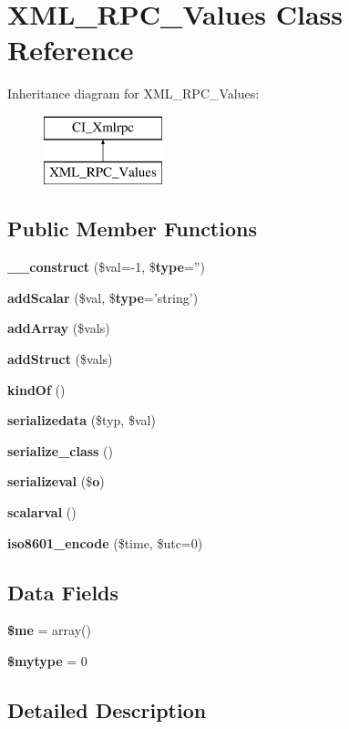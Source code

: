 \section{X\-M\-L\-\_\-\-R\-P\-C\-\_\-\-Values Class Reference}
\label{class_x_m_l___r_p_c___values}
Inheritance diagram for X\-M\-L\-\_\-\-R\-P\-C\-\_\-\-Values\-:\begin{figure}[H]
\begin{center}
\leavevmode
\includegraphics[height=2.000000cm]{class_x_m_l___r_p_c___values}
\end{center}
\end{figure}
\subsection*{Public Member Functions}
\begin{DoxyCompactItemize}
\item 
{\bf \-\_\-\-\_\-construct} (\$val=-\/1, \${\bf type}='')
\item 
{\bf add\-Scalar} (\$val, \${\bf type}='string')
\item 
{\bf add\-Array} (\$vals)
\item 
{\bf add\-Struct} (\$vals)
\item 
{\bf kind\-Of} ()
\item 
{\bf serializedata} (\$typ, \$val)
\item 
{\bf serialize\-\_\-class} ()
\item 
{\bf serializeval} (\${\bf o})
\item 
{\bf scalarval} ()
\item 
{\bf iso8601\-\_\-encode} (\$time, \$utc=0)
\end{DoxyCompactItemize}
\subsection*{Data Fields}
\begin{DoxyCompactItemize}
\item 
{\bf \$me} = array()
\item 
{\bf \$mytype} = 0
\end{DoxyCompactItemize}


\subsection{Detailed Description}


